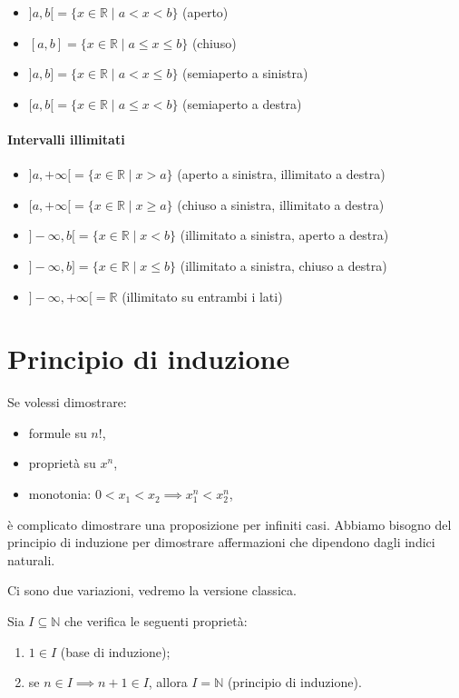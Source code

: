 \begin{itemize}
  \item $]a,b[ = \{ x \in \mathbb{R} \mid a < x < b \}$ (aperto)
  \item $[a,b] = \{ x \in \mathbb{R} \mid a \le x \le b \}$ (chiuso)
  \item $]a,b] = \{ x \in \mathbb{R} \mid a < x \le b \}$ (semiaperto a sinistra)
  \item $[a,b[ = \{ x \in \mathbb{R} \mid a \le x < b \}$ (semiaperto a destra)
\end{itemize}

\paragraph{Intervalli illimitati}

\begin{itemize}
  \item $]a, +\infty[ = \{ x \in \mathbb{R} \mid x > a \}$ (aperto a sinistra, illimitato a destra)
  \item $[a, +\infty[ = \{ x \in \mathbb{R} \mid x \ge a \}$ (chiuso a sinistra, illimitato a destra)
  \item $]-\infty, b[ = \{ x \in \mathbb{R} \mid x < b \}$ (illimitato a sinistra, aperto a destra)
  \item $]-\infty, b] = \{ x \in \mathbb{R} \mid x \le b \}$ (illimitato a sinistra, chiuso a destra)
  \item $]-\infty, +\infty[ = \mathbb{R}$ (illimitato su entrambi i lati)
\end{itemize}

\section{Principio di induzione}
Se volessi dimostrare:
\begin{itemize}
\item formule su $n!$,
\item proprietà su $x^n$,
\item monotonia: $0 < x_1 < x_2 \implies x_1^n < x_2^n$,
\end{itemize}

è complicato dimostrare una proposizione per infiniti casi.
Abbiamo bisogno del principio di induzione per dimostrare affermazioni che dipendono dagli indici naturali.

Ci sono due variazioni, vedremo la versione classica.

Sia $I \subseteq \mathbb{N}$ che verifica le seguenti proprietà:
\begin{enumerate}
\item $1 \in I$ (base di induzione);
\item se $n \in I \implies n+1 \in I$, allora $I = \mathbb{N}$ (principio di induzione).
\end{enumerate}


